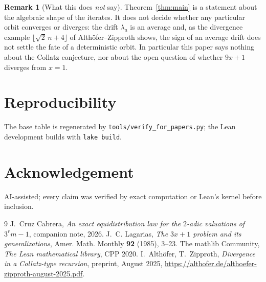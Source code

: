\documentclass[11pt,a4paper]{article}
\theoremstyle{plain}
\theoremstyle{definition}
\newtheorem{remark}[theorem]{Remark}
\begin{document}
\begin{remark}[What this does \emph{not} say]
Theorem~\ref{thm:main} is a statement about the algebraic shape of the iterates. It does not
decide whether any particular orbit converges or diverges: the drift $\lambda_a$ is an
average and, as the divergence example $\lfloor\sqrt2\,n+4\rfloor$ of
Alth\"ofer--Zipproth shows, the sign of an average drift does not settle the fate of a
deterministic orbit. In particular this paper says nothing about the Collatz conjecture, nor
about the open question of whether $9x+1$ diverges from $x=1$.
\end{remark}

\section*{Reproducibility}
The base table is regenerated by \texttt{tools/verify\_for\_papers.py}; the Lean development
builds with \texttt{lake build}.

\section*{Acknowledgement}
AI-assisted; every claim was verified by exact computation or Lean's kernel before inclusion.

\begin{thebibliography}{9}
 J.~Cruz Cabrera, \emph{An exact equidistribution law for the $2$-adic
valuations of $3^rm-1$}, companion note, 2026.
 J.~C. Lagarias, \emph{The $3x+1$ problem and its generalizations},
Amer. Math. Monthly \textbf{92} (1985), 3--23.
 The mathlib Community, \emph{The Lean mathematical library}, CPP 2020.
 I.~Alth\"ofer, T.~Zipproth, \emph{Divergence in a Collatz-type recursion},
preprint, August 2025, \url{https://althofer.de/althoefer-zipproth-august-2025.pdf}.
\end{thebibliography}
\end{document}
